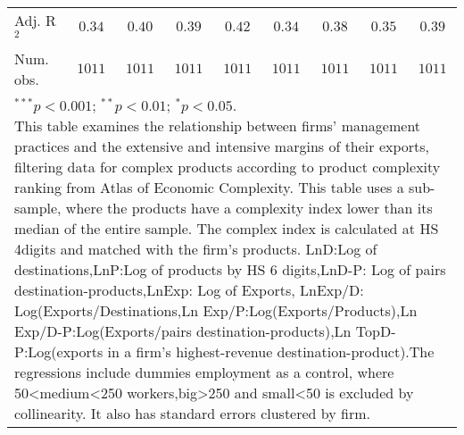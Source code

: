 \documentclass{article}
\begin{document}
\begin{table}
\begin{center}
\begin{normalsize}
\begin{tabular}{l c c c c c c c c}
Adj. R$^2$   & $0.34$       & $0.40$       & $0.39$       & $0.42$       & $0.34$       & $0.38$       & $0.35$       & $0.39$       \\
Num. obs.    & $1011$       & $1011$       & $1011$       & $1011$       & $1011$       & $1011$       & $1011$       & $1011$       \\
\hline
\multicolumn{9}{l}{\scriptsize{\parbox{1\linewidth}{\vspace{3pt}$^{***}p<0.001$; $^{**}p<0.01$; $^{*}p<0.05$. \\This table examines the relationship between firms' management practices and the extensive and intensive margins of their exports, filtering data for complex products according to product complexity ranking from Atlas of Economic Complexity. This table uses a sub-sample, where the products have a complexity index lower than its median of the entire sample. The complex index is calculated at HS 4digits and matched with the firm's products. LnD:Log of destinations,LnP:Log of products by HS 6 digits,LnD-P: Log of pairs destination-products,LnExp: Log of Exports, LnExp/D: Log(Exports/Destinations,Ln Exp/P:Log(Exports/Products),Ln Exp/D-P:Log(Exports/pairs destination-products),Ln TopD-P:Log(exports in a firm's highest-revenue destination-product).The regressions include dummies employment as a control, where 50<medium<250 workers,big>250 and small<50 is excluded by collinearity. It also has standard errors clustered by firm.}}}
\end{tabular}
\end{normalsize}
\label{table:coefficients}
\end{center}
\end{table}
\end{document}

